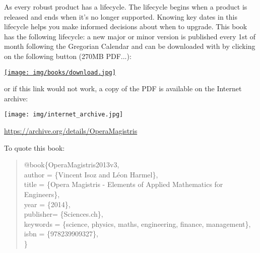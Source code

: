 	As every robust product has a lifecycle. The lifecycle begins when a product is released and ends when it's no longer supported. Knowing key dates in this lifecycle helps you make informed decisions about when to upgrade. This book has the following lifecycle: a new major or minor version is published every 1st of month following the Gregorian Calendar and can be downloaded with by clicking on the following button (270MB PDF...):
	\begin{center}
		\href{http://www.sciences.ch/htmlfr/php/cliccount/click.php?id=317}{\texttt{[image: img/books/download.jpg]}}
	\end{center}
	or if this link would not work, a copy of the PDF is available on the Internet archive:
	\begin{center}
		\texttt{[image: img/internet\_archive.jpg]}
	\end{center}
	\begin{center}
	\href{https://archive.org/details/OperaMagistris}{https://archive.org/details/OperaMagistris}
	\end{center}
	
	To quote this book:
	\begin{quote}
	\noindent @book\{OperaMagistris2013v3, \\
		  author =       \{Vincent Isoz and Léon Harmel\}, \\
		  title =        \{Opera Magistris - Elements of Applied Mathematics for Engineers\}, \\
		  year =         \{2014\}, \\
	      publisher=     \{Sciences.ch\}, \\
		  keywords =     \{science, physics, maths, engineering, finance, management\}, \\
		  isbn =          \{978239909327\},\\
	\}
	\end{quote}